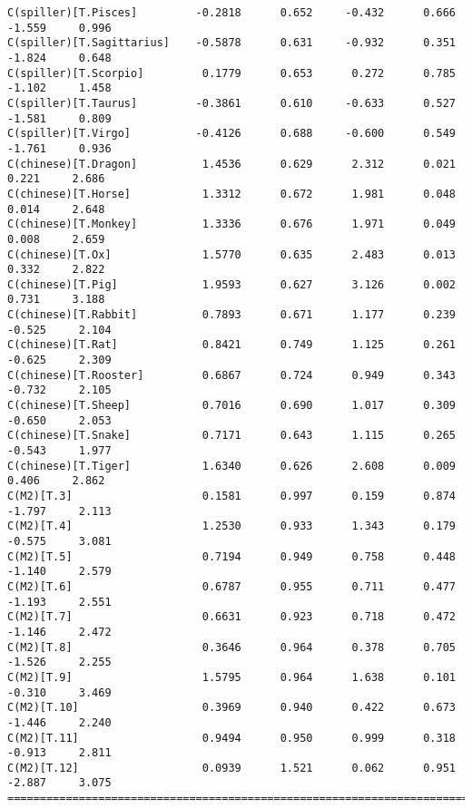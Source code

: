 \documentclass[12pt,fleqn]{article}\usepackage{../common}
\begin{document}
\begin{verbatim}
C(spiller)[T.Pisces]         -0.2818      0.652     -0.432      0.666        -1.559     0.996
C(spiller)[T.Sagittarius]    -0.5878      0.631     -0.932      0.351        -1.824     0.648
C(spiller)[T.Scorpio]         0.1779      0.653      0.272      0.785        -1.102     1.458
C(spiller)[T.Taurus]         -0.3861      0.610     -0.633      0.527        -1.581     0.809
C(spiller)[T.Virgo]          -0.4126      0.688     -0.600      0.549        -1.761     0.936
C(chinese)[T.Dragon]          1.4536      0.629      2.312      0.021         0.221     2.686
C(chinese)[T.Horse]           1.3312      0.672      1.981      0.048         0.014     2.648
C(chinese)[T.Monkey]          1.3336      0.676      1.971      0.049         0.008     2.659
C(chinese)[T.Ox]              1.5770      0.635      2.483      0.013         0.332     2.822
C(chinese)[T.Pig]             1.9593      0.627      3.126      0.002         0.731     3.188
C(chinese)[T.Rabbit]          0.7893      0.671      1.177      0.239        -0.525     2.104
C(chinese)[T.Rat]             0.8421      0.749      1.125      0.261        -0.625     2.309
C(chinese)[T.Rooster]         0.6867      0.724      0.949      0.343        -0.732     2.105
C(chinese)[T.Sheep]           0.7016      0.690      1.017      0.309        -0.650     2.053
C(chinese)[T.Snake]           0.7171      0.643      1.115      0.265        -0.543     1.977
C(chinese)[T.Tiger]           1.6340      0.626      2.608      0.009         0.406     2.862
C(M2)[T.3]                    0.1581      0.997      0.159      0.874        -1.797     2.113
C(M2)[T.4]                    1.2530      0.933      1.343      0.179        -0.575     3.081
C(M2)[T.5]                    0.7194      0.949      0.758      0.448        -1.140     2.579
C(M2)[T.6]                    0.6787      0.955      0.711      0.477        -1.193     2.551
C(M2)[T.7]                    0.6631      0.923      0.718      0.472        -1.146     2.472
C(M2)[T.8]                    0.3646      0.964      0.378      0.705        -1.526     2.255
C(M2)[T.9]                    1.5795      0.964      1.638      0.101        -0.310     3.469
C(M2)[T.10]                   0.3969      0.940      0.422      0.673        -1.446     2.240
C(M2)[T.11]                   0.9494      0.950      0.999      0.318        -0.913     2.811
C(M2)[T.12]                   0.0939      1.521      0.062      0.951        -2.887     3.075
=============================================================================================
\end{verbatim}
\end{document}
